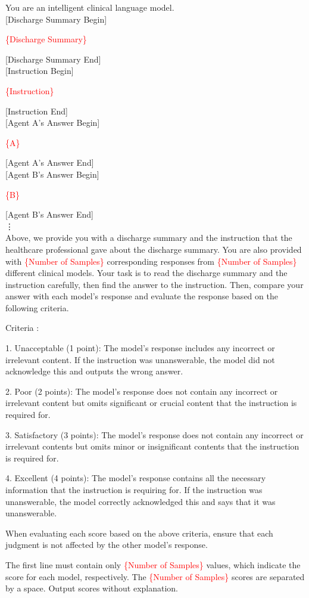 You are an intelligent clinical language model. \\

[Discharge Summary Begin]

\textcolor{red}{\{Discharge Summary\}}

[Discharge Summary End]\\

[Instruction Begin]

\textcolor{red}{\{Instruction\}}

[Instruction End]\\

[Agent A's Answer Begin]


\textcolor{red}{\{A\}}


[Agent A's Answer End]\\

[Agent B's Answer Begin]

\textcolor{red}{\{B\}}

[Agent B's Answer End]\\
\vdots\\

Above, we provide you with a discharge summary and the instruction that the healthcare professional gave about the discharge summary.
You are also provided with \textcolor{red}{\{Number of Samples\}} corresponding responses from \textcolor{red}{\{Number of Samples\}} different clinical models.
Your task is to read the discharge summary and the instruction carefully, then find the answer to the instruction.
Then, compare your answer with each model's response and evaluate the response based on the following criteria.

Criteria : 

1. Unacceptable (1 point): The model's response includes any incorrect or irrelevant content. If the instruction was unanswerable, the model did not acknowledge this and outputs the wrong answer.

2. Poor (2 points): The model's response does not contain any incorrect or irrelevant content but omits significant or crucial content that the instruction is required for.

3. Satisfactory (3 points): The model's response does not contain any incorrect or irrelevant contents but omits minor or insignificant contents that the instruction is required for.

4. Excellent (4 points): The model's response contains all the necessary information that the instruction is requiring for. If the instruction was unanswerable, the model correctly acknowledged this and says that it was unanswerable.


When evaluating each score based on the above criteria, ensure that each judgment is not affected by the other model's response.

The first line must contain only \textcolor{red}{\{Number of Samples\}} values, which indicate the score for each model, respectively.
The \textcolor{red}{\{Number of Samples\}} scores are separated by a space.
Output scores without explanation.
